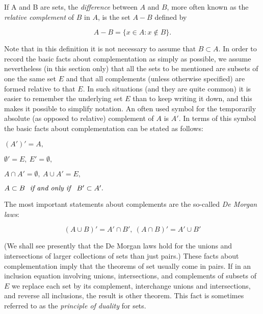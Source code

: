 
If A and B are sets, the \textit{difference} between $A$ and $B$, more often known as the \textit{relative complement} of $B$ in $A$, is the set $A - B$ defined by 

\begin{equation*}
A - B = \{ x \in A: x \notin B \}.
\end{equation*}

Note that in this definition it is not necessary to assume that $B \subset A$. In order to record the basic facts about complementation as simply as possible, we assume nevertheless (in this section only) that all the sets to be mentioned are subsets of one the same set $E$ and that all complements (unless otherwise specified) are formed relative to that $E$. In such situations (and they are quite common) it is easier to remember the underlying set $E$ than to keep writing it down, and this makes it possible to simplify notation. An often used symbol for the temporarily absolute (as opposed to relative) complement of $A$ is $A'$. In terms of this symbol the basic facts about complementation can be stated as follows:

\begin{center}
$(A')' = A,$

$\emptyset ' = E, \: E' = \emptyset ,$

$ A \cap A' = \emptyset, \: A \cup A' = E,$

$A \subset B \text{ \textit{ if and only if } } B' \subset A'.$
\end{center}

The most important statements about complements are the so-called \textit{De Morgan laws}:

\begin{equation*}
(A \cup B)' = A' \cap B', \: (A \cap B)' = A' \cup B'
\end{equation*}

(We shall see presently that the De Morgan laws hold for the unions and intersections of larger collections of sets than just pairs.) These facts about complementation imply that the theorems of set usually come in pairs. If in an inclusion equation involving unions, intersections, and complements of subsets of $E$ we replace each set by its complement, interchange unions and intersections, and reverse all  inclusions, the result is other theorem. This fact is sometimes referred to as the \textit{principle of duality} for sets.

